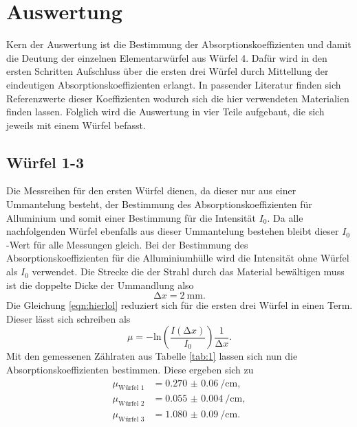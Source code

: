 \section{Auswertung}
Kern der Auswertung ist die Bestimmung der Absorptionskoeffizienten und damit die Deutung der einzelnen Elementarwürfel aus Würfel 4.
Dafür wird in den ersten Schritten Aufschluss über die ersten drei Würfel durch Mittellung der eindeutigen Absorptionskoeffizienten erlangt. 
In passender Literatur \cite{...} finden sich Referenzwerte dieser Koeffizienten wodurch sich die hier verwendeten Materialien finden lassen.  
Folglich wird die Auswertung in vier Teile aufgebaut, die sich jeweils mit einem Würfel befasst. 

\subsection{Würfel 1-3}
Die Messreihen für den ersten Würfel dienen, da dieser nur aus einer Ummantelung besteht, der Bestimmung des Absorptionskoeffizienten für Alluminium und somit einer Bestimmung 
für die Intensität $I_0$. Da alle nachfolgenden Würfel ebenfalls aus dieser Ummantelung bestehen bleibt dieser $I_0$-Wert für alle Messungen gleich. Bei der Bestimmung des Absorptionskoeffizienten für die Alluminiumhülle
wird die Intensität ohne Würfel als $I_0$ verwendet. 
Die Strecke die der Strahl durch das Material bewältigen muss ist die doppelte Dicke der Ummandlung also
\begin{equation}
    \increment x = \SI{2}{\milli\meter}.
\end{equation}
Die Gleichung \eqref{eqn:hierlol} reduziert sich für die ersten drei Würfel in einen Term. Dieser lässt sich schreiben als
\begin{equation}
\mu = - \text{ln} \left( \frac{I(\increment x)}{I_0} \right) \frac{1}{\increment x}.
\end{equation}
Mit den gemessenen Zählraten aus Tabelle \ref{tab:1} lassen sich nun die Absorptionskoeffizienten bestimmen. Diese ergeben sich zu
\begin{align}
\mu_{\text{Würfel 1}} &= \SI{0.270(60)}{\per\centi\meter},\\
\mu_{\text{Würfel 2}} &= \SI{0.055(4)}{\per\centi\meter},\\
\mu_{\text{Würfel 3}} &= \SI{1.080(90)}{\per\centi\meter}. 
\end{align}
